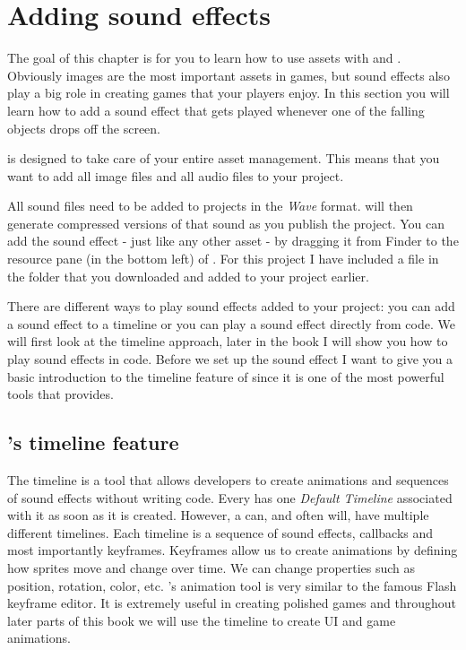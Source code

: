 \section{Adding sound effects}
The goal of this chapter is for you to learn how to use assets with \SB{} and
\cocos{}. Obviously images are the most important assets in games, but sound
effects also play a big role in creating games that your players enjoy. In this
section you will learn how to add a sound effect that gets played whenever one
of the falling objects drops off the screen.

\SB{} is designed to take care of your entire asset management. This means that
you want to add all image files and all audio files to your \SB{} project.

All sound files need to be added to \SB{} projects in the \textit{Wave}
format. \SB{} will then generate compressed versions of that sound as you
publish the project. You can add the sound effect - just like any other asset -
by dragging it from Finder to the resource pane (in the bottom left) of \SB{}. For this project I have included a 
file in the  folder that you downloaded and added to your
project earlier.

There are different ways to play sound effects added to your \SB{} project: you
can add a sound effect to a \SB{} timeline or you can play a sound effect
directly from code. We will first look at the timeline approach, later in the
book I will show you how to play sound effects in code.
Before we set up the sound effect I want to give you a basic introduction to the timeline feature
of \SB{} since it is one of the most powerful tools that \SB{} provides.

\subsection{\SB{}'s timeline feature}
The \SB{} timeline is a tool that allows developers to create animations and
sequences of sound effects without writing code. Every \ccbfile{} has one
\textit{Default Timeline} associated with it as soon as it is created. However,
a \ccbfile{} can, and often will, have multiple different timelines. Each
timeline is a sequence of sound effects, callbacks and most importantly
keyframes. Keyframes allow us to create animations by defining how sprites move
and change over time. We can change properties such as position, rotation,
color, etc. \SB{}'s animation tool is very similar to the famous Flash keyframe
editor. It is extremely useful in creating polished games and throughout later
parts of this book we will use the \SB{} timeline to create UI and game
animations.

